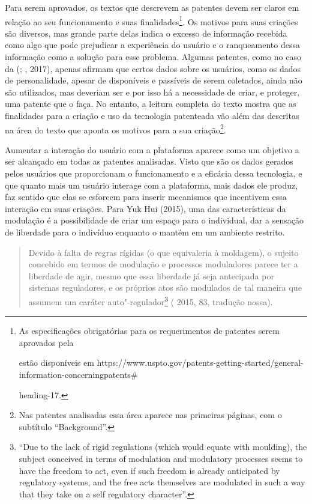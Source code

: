 Para serem aprovados, os textos que descrevem as patentes devem ser
claros em relação ao seu funcionamento e suas finalidades\footnote{As
  especificações obrigatórias para os requerimentos de patentes serem
  aprovados pela 

  estão disponíveis em
  https://www.uspto.gov/patents-getting-started/general-information-concerningpatents\#

  heading-17.}. Os motivos para suas criações são diversos, mas grande
parte delas indica o excesso de informação recebida como algo que pode
prejudicar a experiência do usuário e o ranqueamento dessa informação
como a solução para esse problema. Algumas patentes, como no caso da
 (; , 2017), apenas afirmam que certos dados sobre
os usuários, como os dados de personalidade, apesar de disponíveis e
passíveis de serem coletados, ainda não são utilizados, mas deveriam ser
e por isso há a necessidade de criar, e proteger, uma patente que o
faça. No entanto, a leitura completa do texto mostra que as finalidades
para a criação e uso da tecnologia patenteada vão além das descritas na
área do texto que aponta os motivos para a sua criação\footnote{Nas
  patentes analisadas essa área aparece nas primeiras páginas, com o
  subtítulo ``Background''.}.

Aumentar a interação do usuário com a plataforma aparece como um
objetivo a ser alcançado em todas as patentes analisadas. Visto que são
os dados gerados pelos usuários que proporcionam o funcionamento e a
eficácia dessa tecnologia, e que quanto mais um usuário interage com a
plataforma, mais dados ele produz, faz sentido que elas se esforcem para
inserir mecanismos que incentivem essa interação em suas criações. Para
Yuk Hui (2015), uma das características da modulação é a possibilidade
de criar um espaço para o individual, dar a sensação de liberdade para o
indivíduo enquanto o mantém em um ambiente restrito.

\begin{quote}
Devido à falta de regras rígidas (o que equivaleria à moldagem), o
sujeito concebido em termos de modulação e processos moduladores parece
ter a liberdade de agir, mesmo que essa liberdade já seja antecipada por
sistemas reguladores, e os próprios atos são modulados de tal maneira
que assumem um caráter auto"-regulador\footnote{``Due to the lack of
  rigid regulations (which would equate with moulding), the subject
  conceived in terms of modulation and modulatory processes seems to
  have the freedom to act, even if such freedom is already anticipated
  by regulatory systems, and the free acts themselves are modulated in
  such a way that they take on a self regulatory character''.} (
2015, 83, tradução nossa).
\end{quote}

